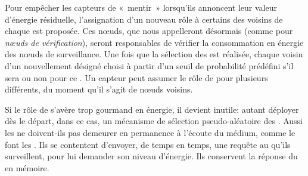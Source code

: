 Pour empêcher les capteurs de « mentir » lorsqu'ils annoncent leur valeur d'énergie résiduelle, l'assignation d'un nouveau rôle à certains des voisins de chaque \cn est proposée.
Ces nœuds, que nous appelleront désormais \vns (comme pour \textit{nœuds de vérification}), seront responsables de vérifier la consommation en énergie des nœuds de surveillance.
Une fois que la sélection des \cns est réalisée, chaque voisin d'un \cn nouvellement désigné choisi à partir d'un seuil de probabilité prédéfini s'il sera ou non \vn pour ce \cn.
Un capteur peut assumer le rôle de \vn pour plusieurs \cn différents, du moment qu'il s'agit de nœuds voisins.

Si le rôle de \vn s'avère trop gourmand en énergie, il devient inutile: autant déployer dès le départ, dans ce cas, un mécanisme de sélection pseudo-aléatoire des \cns.
Aussi les \vns ne doivent-ils pas demeurer en permanence à l'écoute du médium, comme le font les \cns.
Ils se contentent d'envoyer, de temps en temps, une requête au \cn qu'ils surveillent, pour lui demander son niveau d'énergie.
Ils conservent la réponse du \cn en mémoire.

